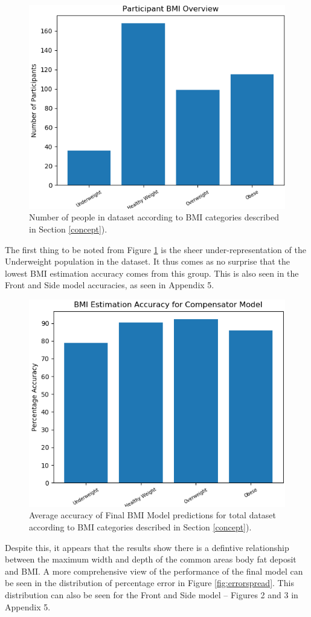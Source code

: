 \documentclass[conference]{IEEEtran}
\begin{document}
\begin{figure}
	\centering
	\includegraphics[width=0.6\linewidth]{spread.png}
	\caption{Number of people in dataset according to BMI categories described in Section \ref{concept}).}
	\label{fig:spread}
\end{figure}

The first thing to be noted from Figure \ref{fig:spread} is the sheer under-representation of the Underweight population in the dataset.
It thus comes as no surprise that the lowest BMI estimation accuracy comes from this group.
This is also seen in the Front and Side model accuracies, as seen in Appendix 5.

\begin{figure}
	\centering
	\includegraphics[width=0.6\linewidth]{accuracies.png}
	\caption{Average accuracy of Final BMI Model predictions for total dataset according to BMI categories described in Section \ref{concept}).}
	\label{fig:accuracies}
\end{figure}

Despite this, it appears that the results show there is a defintive relationship between the maximum width and depth of the common areas body fat deposit and BMI.
A more comprehensive view of the performance of the final model can be seen in the distribution of percentage error in Figure \ref{fig:errorspread}.
This distribution can also be seen for the Front and Side model -- Figures 2 and 3 in Appendix 5.
\end{document}
